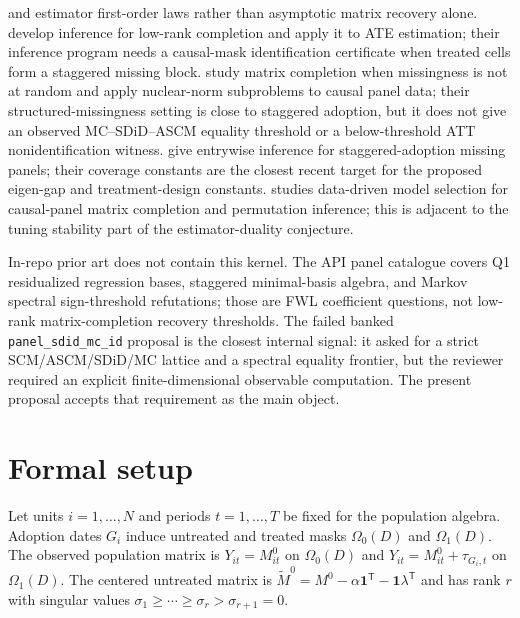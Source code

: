 \documentclass[11pt]{article}
\newcommand{\one}{\mathbf{1}}
\newcommand{\transpose}{\mathsf{T}}
\theoremstyle{definition}
\theoremstyle{plain}
\theoremstyle{remark}
\begin{document}
and estimator first-order laws rather than asymptotic matrix recovery alone.
\citet{ChoiKwonLiao2024} develop inference for low-rank completion and apply
it to ATE estimation; their inference program needs a causal-mask
identification certificate when treated cells form a staggered missing block.
\citet{ChoiYuan2024} study matrix completion when missingness is not at
random and apply nuclear-norm subproblems to causal panel data; their
structured-missingness setting is close to staggered adoption, but it does not
give an observed MC--SDiD--ASCM equality threshold or a below-threshold ATT
nonidentification witness.
\citet{YanWainwright2024} give entrywise inference for staggered-adoption
missing panels; their coverage constants are the closest recent target for
the proposed eigen-gap and treatment-design constants.
\citet{Heiniger2024} studies data-driven model selection for causal-panel
matrix completion and permutation inference; this is adjacent to the tuning
stability part of the estimator-duality conjecture.

In-repo prior art does not contain this kernel. The API panel catalogue covers
Q1 residualized regression bases, staggered minimal-basis algebra, and Markov
spectral sign-threshold refutations; those are FWL coefficient questions, not
low-rank matrix-completion recovery thresholds. The failed banked
\texttt{panel\_sdid\_mc\_id} proposal is the closest internal signal: it asked
for a strict SCM/ASCM/SDiD/MC lattice and a spectral equality frontier, but the
reviewer required an explicit finite-dimensional observable computation. The
present proposal accepts that requirement as the main object.

\section{Formal setup}
\label{sec:setup}
Let units $i=1,\ldots,N$ and periods $t=1,\ldots,T$ be fixed for the
population algebra. Adoption dates $G_i$ induce untreated and treated masks
$\Omega_0(D)$ and $\Omega_1(D)$. The observed population matrix is
$Y_{it}=M^0_{it}$ on $\Omega_0(D)$ and $Y_{it}=M^0_{it}+\tau_{G_i,t}$ on
$\Omega_1(D)$. The centered untreated matrix is
$\widetilde M^0=M^0-\alpha\one^\transpose-\one\lambda^\transpose$ and has
rank $r$ with singular values
$\sigma_1\ge\cdots\ge\sigma_r>\sigma_{r+1}=0$.
\end{document}
